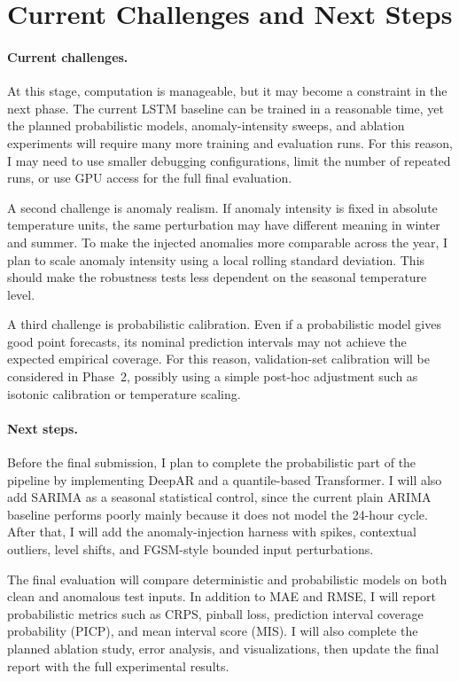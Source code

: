 \documentclass[11pt,a4paper]{article}
\begin{document}
\section{Current Challenges and Next Steps}

\paragraph{Current challenges.}
At this stage, computation is manageable, but it may become a constraint in
the next phase. The current LSTM baseline can be trained in a reasonable time,
yet the planned probabilistic models, anomaly-intensity sweeps, and ablation
experiments will require many more training and evaluation runs. For this
reason, I may need to use smaller debugging configurations, limit the number
of repeated runs, or use GPU access for the full final evaluation.

A second challenge is anomaly realism. If anomaly intensity is fixed in
absolute temperature units, the same perturbation may have different meaning
in winter and summer. To make the injected anomalies more comparable across
the year, I plan to scale anomaly intensity using a local rolling standard
deviation. This should make the robustness tests less dependent on the
seasonal temperature level.

A third challenge is probabilistic calibration. Even if a probabilistic model
gives good point forecasts, its nominal prediction intervals may not achieve
the expected empirical coverage. For this reason, validation-set calibration
will be considered in Phase~2, possibly using a simple post-hoc adjustment
such as isotonic calibration or temperature scaling.

\paragraph{Next steps.}
Before the final submission, I plan to complete the probabilistic part of
the pipeline by implementing DeepAR and a quantile-based Transformer. I
will also add SARIMA as a seasonal statistical control, since the current
plain ARIMA baseline performs poorly mainly because it does not model the
24-hour cycle. After that, I will add the anomaly-injection harness with
spikes, contextual outliers, level shifts, and FGSM-style bounded input
perturbations.

The final evaluation will compare deterministic and probabilistic models
on both clean and anomalous test inputs. In addition to MAE and RMSE, I
will report probabilistic metrics such as CRPS, pinball loss, prediction
interval coverage probability (PICP), and mean interval score (MIS). I
will also complete the planned ablation study, error analysis, and
visualizations, then update the final report with the full experimental
results.
\end{document}
